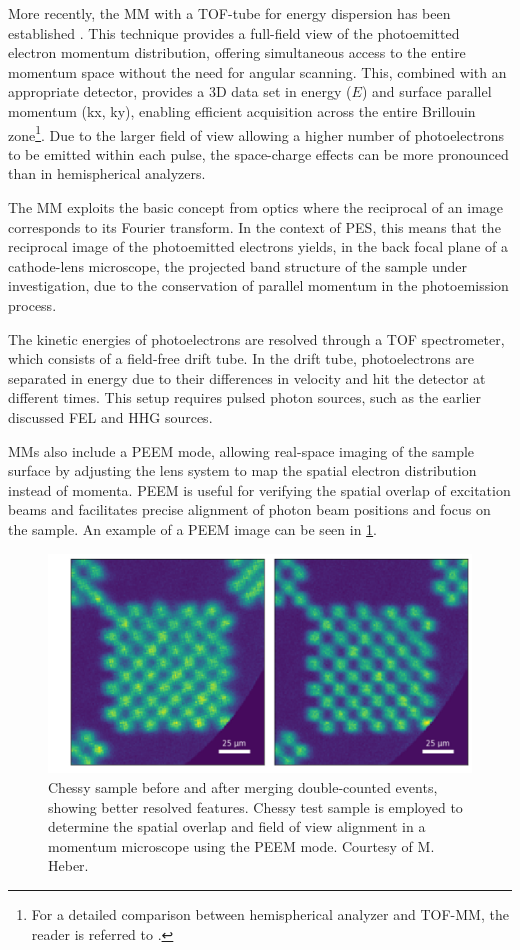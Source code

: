 More recently, the \gls{MM} with a \gls{TOF}-tube for energy dispersion has been established \cite{schonhenseSpaceTimeSpinresolved2015}. This technique provides a full-field view of the photoemitted electron momentum distribution, offering simultaneous access to the entire momentum space without the need for angular scanning. This, combined with an appropriate detector, provides a 3D data set in energy ($E$) and surface parallel momentum (\gls{kx}, \gls{ky}), enabling efficient acquisition across the entire Brillouin zone\footnote{For a detailed comparison between hemispherical analyzer and \gls{TOF}-\gls{MM}, the reader is referred to \cite{maklarQuantitativeComparisonTimeflight2020}.}. Due to the larger field of view allowing a higher number of photoelectrons to be emitted within each pulse, the space-charge effects can be more pronounced than in hemispherical analyzers.

The \gls{MM} exploits the basic concept from optics where the reciprocal of an image corresponds to its Fourier transform. In the context of \gls{PES}, this means that the reciprocal image of the photoemitted electrons yields, in the back focal plane of a cathode-lens microscope, the projected band structure of the sample under investigation, due to the conservation of parallel momentum in the photoemission process.

The kinetic energies of photoelectrons are resolved through a TOF spectrometer, which consists of a field-free drift tube. In the drift tube, photoelectrons are separated in energy due to their differences in velocity and hit the detector at different times. This setup requires pulsed photon sources, such as the earlier discussed \gls{FEL} and \gls{HHG} sources.

\Glspl{MM} also include a \gls{PEEM} mode, allowing real-space imaging of the sample surface by adjusting the lens system to map the spatial electron distribution instead of momenta. \gls{PEEM} is useful for verifying the spatial overlap of excitation beams and facilitates precise alignment of photon beam positions and focus on the sample. An example of a \gls{PEEM} image can be seen in \cref{fig:chessy-distribution}.

\begin{figure}
    \centering
    \includegraphics[width=0.7\linewidth]{images/chessy_deblurring_merged_events.png}
    \caption{Chessy sample before and after merging double-counted events, showing better resolved features. Chessy test sample is employed to determine the spatial overlap and field of view alignment in a momentum microscope using the \gls{PEEM} mode. Courtesy of M. Heber.}
    \label{fig:chessy-distribution}
\end{figure}


